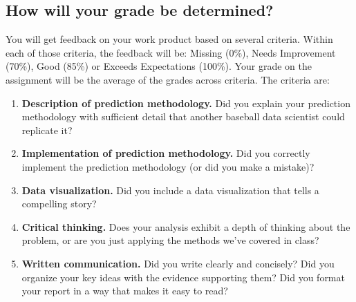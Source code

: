 \documentclass{article}
\begin{document}
    \subsection*{\sc How will your grade be determined?}

      You will get feedback on your work product based on several criteria. Within each of those criteria, the feedback will be: Missing (0\%), Needs Improvement (70\%), Good (85\%) or Exceeds Expectations (100\%). Your grade on the assignment will be the average of the grades across criteria. The criteria are:
      \begin{enumerate}
        \item {\bf Description of prediction methodology.} Did you explain your prediction methodology with sufficient detail that another baseball data scientist could replicate it?
        \item {\bf Implementation of prediction methodology.} Did you correctly implement the prediction methodology (or did you make a mistake)?
        \item {\bf Data visualization.} Did you include a data visualization that tells a compelling story?
        \item {\bf Critical thinking.} Does your analysis exhibit a depth of thinking about the problem, or are you just applying the methods we've covered in class?
        \item {\bf Written communication.} Did you write clearly and concisely? Did you organize your key ideas with the evidence supporting them? Did you format your report in a way that makes it easy to read?
      \end{enumerate}
\end{document}

